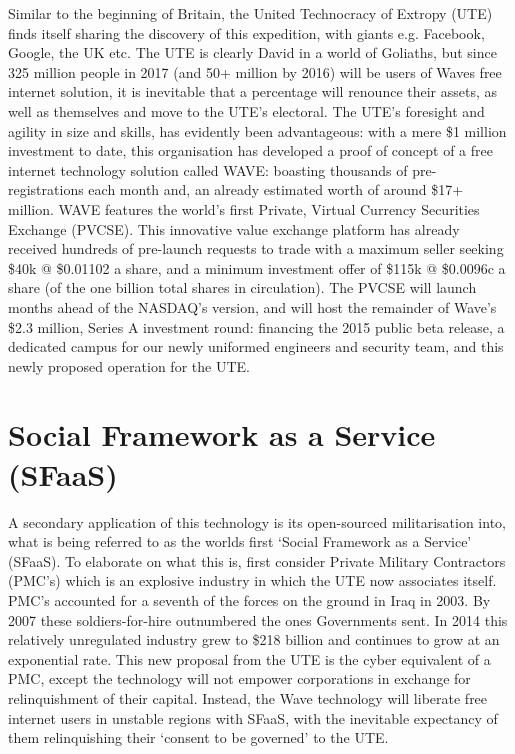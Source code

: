 \documentclass[letterpaper,10pt,openany,oneside,english]{sphinxmanual}
\begin{document}
Similar to the beginning of Britain, the United Technocracy of Extropy (UTE) finds itself sharing the discovery of this expedition, with giants e.g. Facebook, Google, the UK etc. The UTE is clearly David in a world of Goliaths, but since 325 million people in 2017 (and 50+ million by 2016) will be users of Waves free internet solution, it is inevitable that a percentage will renounce their assets, as well as themselves and move to the UTE’s electoral. The UTE’s foresight and agility in size and skills, has evidently been advantageous: with a mere \$1 million investment to date, this organisation has developed a proof of concept of a free internet technology solution called WAVE: boasting thousands of pre-registrations each month and, an already estimated worth of around \$17+ million. WAVE features the world’s first Private, Virtual Currency Securities Exchange (PVCSE). This innovative value exchange platform has already received hundreds of pre-launch requests to trade with a maximum seller seeking \$40k @ \$0.01102 a share, and a minimum investment offer of \$115k @ \$0.0096c a share (of the one billion total shares in circulation). The PVCSE will launch months ahead of the NASDAQ’s version, and will host the remainder of Wave’s \$2.3 million, Series A investment round: financing the 2015 public beta release, a dedicated campus for our newly uniformed engineers and security team, and this newly proposed operation for the UTE.


\chapter{Social Framework as a Service (SFaaS)}
\label{\detokenize{sfaas:social-framework-as-a-service-sfaas}}\label{\detokenize{sfaas::doc}}
A secondary application of this technology is its open-sourced militarisation into, what is being referred to as the worlds first ‘Social Framework as a Service’ (SFaaS). To elaborate on what this is, first consider Private Military Contractors (PMC’s) which is an explosive industry in which the UTE now associates itself. PMC’s accounted for a seventh of the forces on the ground in Iraq in 2003. By 2007 these soldiers-for-hire outnumbered the ones Governments sent. In 2014 this relatively unregulated industry grew to \$218 billion and continues to grow at an exponential rate. This new proposal from the UTE is the cyber equivalent of a PMC, except the technology will not empower corporations in exchange for relinquishment of their capital. Instead, the Wave technology will liberate free internet users in unstable regions with SFaaS, with the inevitable expectancy of them relinquishing their ‘consent to be governed’ to the UTE.
\end{document}
